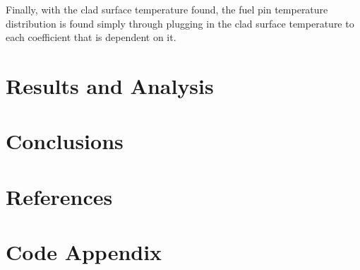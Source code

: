 \documentclass{article}
\begin{document}
Finally, with the clad surface temperature found, the fuel pin temperature distribution is found simply through plugging in the clad surface temperature to each coefficient that is dependent on it.

\clearpage
\section{Results and Analysis}

\section{Conclusions}

\section{References}

\section{Code Appendix}
\begin{python}

\end{python}
\end{document}
